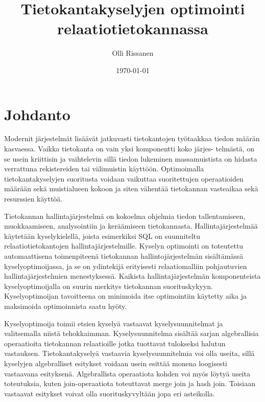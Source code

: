 \documentclass[finnish]{tktltiki2}
\title{Tietokantakyselyjen optimointi relaatiotietokannassa}
\author{Olli Rissanen}
\date{\today}
\theoremstyle{definition}
\theoremstyle{remark}
\begin{document}

\maketitle
\makeabstract
\tableofcontents
\newpage



\section{Johdanto}
Modernit järjestelmät lisäävät jatkuvasti tietokantojen työtaakkaa tiedon määrän kasvaessa. Vaikka tietokanta on vain yksi komponentti koko järjes- telmästä, on se usein kriittisin ja vaihtelevin sillä tiedon lukeminen massamuistista on hidasta verrattuna rekistereiden tai välimuistin käyttöön. Optimoimalla tietokantakyselyjen suoritusta voidaan vaikuttaa suoritettujen operaatioiden määrään sekä muistialueen kokoon ja siten vähentää tietokannan vasteaikaa sekä resurssien käyttöä. \cite{mor2012}
	
% 

Tietokannan hallintajärjestelmä on kokoelma ohjelmia tiedon tallentamiseen, muokkaamiseen, analysointiin ja keräämiseen tietokannasta. Hallintajärjestelmää käytetään kyselykielellä, joista esimerkiksi SQL on suunniteltu relaatiotietokantojen hallintajärjestelmille. Kyselyn optimointi on toteutettu automaattisena toimenpiteenä tietokannan hallintojärjestelmän sisältämässä kyselyoptimoijassa, ja se on ydintekijä erityisesti relaatiomalliin pohjautuvien hallintajärjestelmien menestyksessä. Kaikista hallintajärjestelmän komponenteista kyselyoptimoijalla on suurin merkitys tietokannan suorituskykyyn. Kyselyoptimoijan tavoitteena on minimoida itse optimointiin käytetty aika ja maksimoida optimoinnista saatu hyöty. \cite{jarke1984} 

Kyselyoptimoija toimii etsien kyselyä vastaavat kyselysuunnitelmat ja valitsemalla niistä tehokkaimman. Kyselysuunnitelma sisältää sarjan algebrallisia operaatioita tietokannan relaatioille jotka tuottavat tulokseksi halutun vastauksen. Tietokantakyselyä vastaavia kyselysuunnitelmia voi olla useita, sillä kyselyjen algebralliset esitykset voidaan usein esittää monena loogisesti vastaavana esityksenä. Algebrallista operaatiota kohden voi myös löytyä useita toteutuksia, kuten join-operaatiota toteuttavat merge join ja hash join. Toisiaan vastaavat esitykset voivat olla suorituskyvyltään jopa eri asteikolla.
\end{document}
